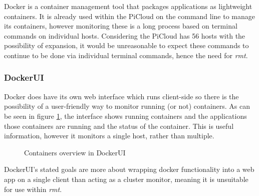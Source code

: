 Docker \citep{docker} is a container management tool that packages applications as lightweight containers.
It is already used within the PiCloud on the command line to manage its containers, however monitoring these is a long process based on terminal commands on individual hosts.
Considering the PiCloud has 56 hosts with the possibility of expansion, it would be unreasonable to expect these commands to continue to be done via individual terminal commands, hence the need for \emph{rmt}.
 
 \subsubsection{DockerUI}
 Docker does have its own web interface which runs client-side so there is the possibility of a user-friendly way to monitor running (or not) containers.
 As can be seen in figure \ref{fig:dockerUiContainers}, the interface shows running containers and the applications those containers are running and the status of the container.
 This is useful information, however it monitors a single host, rather than multiple.

 \begin{figure}[t]
 	\centering
	\setlength\fboxsep{0pt}
	\setlength\fboxrule{0.5pt}
 	\caption{Containers overview in DockerUI}
 	\label{fig:dockerUiContainers}
 \end{figure}

 DockerUI's stated goals are more about wrapping docker functionality into a web app on a single client than acting as a cluster monitor, meaning it is unsuitable for use within \emph{rmt}.
